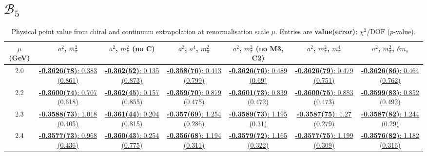 \documentclass[12pt]{extarticle}
\begin{document}
\section{$\mathcal{B}_5$}
\begin{table}[h!]
\begin{center}
\begin{tabular}{|c|c|c|c|c|c|c|}
\hline
$\mu$ (GeV) & $a^2$, $m_\pi^2$& $a^2$, $m_\pi^2$ (no C)& $a^2$, $a^4$, $m_\pi^2$& $a^2$, $m_\pi^2$ (no M3, C2)& $a^2$, $m_\pi^2$, $m_\pi^4$& $a^2$, $m_\pi^2$, $\delta m_s$\\
\hline
2.0& \hyperlink{TT/NPR/a2m2_20.pdf.1}{\textbf{-0.3626(78)}: 0.383 (0.861)} & \hyperlink{TT/NPR/a2m2noC_20.pdf.1}{\textbf{-0.362(52)}: 0.135 (0.873)} & \hyperlink{TT/NPR/a2a4m2_20.pdf.1}{\textbf{-0.358(76)}: 0.413 (0.799)} & \hyperlink{TT/NPR/a2m2mcut_20.pdf.1}{\textbf{-0.3626(76)}: 0.489 (0.69)} & \hyperlink{TT/NPR/a2m2m4_20.pdf.1}{\textbf{-0.3626(79)}: 0.479 (0.751)} & \hyperlink{TT/NPR/a2m2delm_20.pdf.1}{\textbf{-0.3626(86)}: 0.464 (0.762)}\\
2.2& \hyperlink{TT/NPR/a2m2_22.pdf.1}{\textbf{-0.3600(74)}: 0.707 (0.618)} & \hyperlink{TT/NPR/a2m2noC_22.pdf.1}{\textbf{-0.362(45)}: 0.157 (0.855)} & \hyperlink{TT/NPR/a2a4m2_22.pdf.1}{\textbf{-0.359(70)}: 0.879 (0.475)} & \hyperlink{TT/NPR/a2m2mcut_22.pdf.1}{\textbf{-0.3601(73)}: 0.839 (0.472)} & \hyperlink{TT/NPR/a2m2m4_22.pdf.1}{\textbf{-0.3600(75)}: 0.883 (0.473)} & \hyperlink{TT/NPR/a2m2delm_22.pdf.1}{\textbf{-0.3599(83)}: 0.852 (0.492)}\\
2.3& \hyperlink{TT/NPR/a2m2_23.pdf.1}{\textbf{-0.3588(73)}: 1.018 (0.405)} & \hyperlink{TT/NPR/a2m2noC_23.pdf.1}{\textbf{-0.361(44)}: 0.204 (0.815)} & \hyperlink{TT/NPR/a2a4m2_23.pdf.1}{\textbf{-0.357(69)}: 1.254 (0.286)} & \hyperlink{TT/NPR/a2m2mcut_23.pdf.1}{\textbf{-0.3589(73)}: 1.195 (0.31)} & \hyperlink{TT/NPR/a2m2m4_23.pdf.1}{\textbf{-0.3587(75)}: 1.27 (0.279)} & \hyperlink{TT/NPR/a2m2delm_23.pdf.1}{\textbf{-0.3587(82)}: 1.244 (0.29)}\\
2.4& \hyperlink{TT/NPR/a2m2_24.pdf.1}{\textbf{-0.3577(73)}: 0.968 (0.436)} & \hyperlink{TT/NPR/a2m2noC_24.pdf.1}{\textbf{-0.360(43)}: 0.254 (0.775)} & \hyperlink{TT/NPR/a2a4m2_24.pdf.1}{\textbf{-0.356(68)}: 1.194 (0.311)} & \hyperlink{TT/NPR/a2m2mcut_24.pdf.1}{\textbf{-0.3579(72)}: 1.165 (0.322)} & \hyperlink{TT/NPR/a2m2m4_24.pdf.1}{\textbf{-0.3577(75)}: 1.199 (0.309)} & \hyperlink{TT/NPR/a2m2delm_24.pdf.1}{\textbf{-0.3576(82)}: 1.182 (0.316)}\\
\hline
\end{tabular}
\caption{Physical point value from chiral and continuum extrapolation at renormalisation scale $\mu$. Entries are \textbf{value(error)}: $\chi^2/\text{DOF}$ ($p$-value).}
\end{center}
\end{table}
\end{document}

